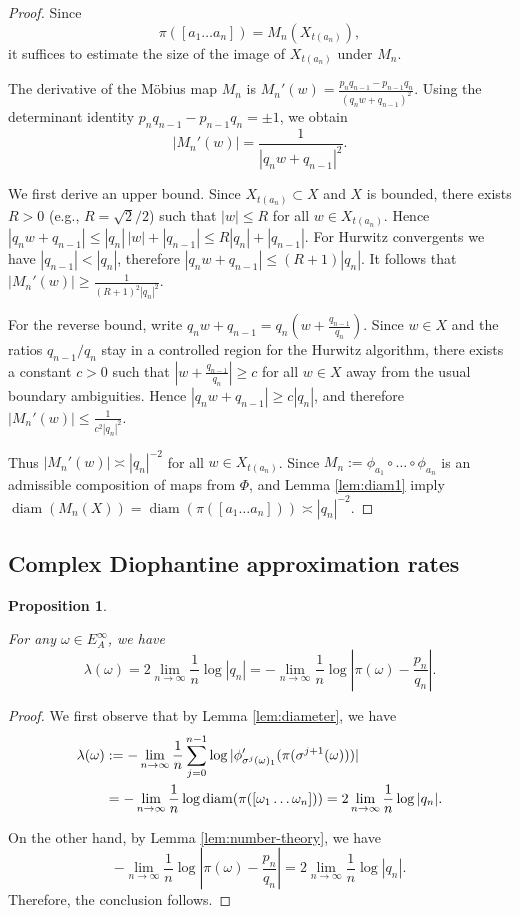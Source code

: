 \documentclass[11pt]{amsart}
\theoremstyle{plain}
\newtheorem{proposition}[theorem]{Proposition}
\theoremstyle{definition}
\renewcommand\~{\tilde}%
\newcommand{\om}{\ensuremath{\omega}}
\numberwithin{equation}{section}
\begin{document}
\begin{proof}
Since
$$
\pi([a_1\dots a_n])=M_n(X_{t(a_{n})}),
$$
it suffices to estimate the size of the image of $X_{t(a_{n})}$ under $M_n$.

The derivative of the Möbius map $M_n$ is
$
M_n'(w)
=
\frac{p_nq_{n-1}-p_{n-1}q_n}{(q_n w+q_{n-1})^2}.
$
Using the determinant identity $p_nq_{n-1}-p_{n-1}q_n=\pm 1$,
we obtain
$$
|M_n'(w)|=\frac{1}{|q_n w+q_{n-1}|^2}.
$$

We first derive an upper bound. Since $X_{t(a_{n})}\subset X$ and $X$ is bounded, there exists $R>0$ (e.g., $R=\sqrt{2}/2$) such that
$|w|\le R$ for all $w\in X_{t(a_{n})}$.
Hence
$
|q_n w+q_{n-1}|
\le |q_n|\,|w|+|q_{n-1}|
\le R|q_n|+|q_{n-1}|.
$
For Hurwitz convergents we have $|q_{n-1}|<|q_n|$, therefore $|q_n w+q_{n-1}|\le (R+1)|q_n|$.
It follows that
$
|M_n'(w)|\ge \frac{1}{(R+1)^2|q_n|^2}.
$

For the reverse bound, write
$
q_n w+q_{n-1}=q_n\left(w+\frac{q_{n-1}}{q_n}\right).
$
Since $w\in X$ and the ratios $q_{n-1}/q_n$ stay in a controlled region for the Hurwitz algorithm, there exists a constant $c>0$ such that $
\left|w+\frac{q_{n-1}}{q_n}\right|\ge c$ for all $w \in X$ away from the usual boundary ambiguities. Hence $|q_n w+q_{n-1}|\ge c|q_n|$, and therefore
$
|M_n'(w)|\le \frac{1}{c^2|q_n|^2}.
$

Thus $|M_n'(w)|\asymp |q_n|^{-2}$ for all $w\in X_{t(a_{n})}$.
Since $M_n:= \phi_{a_1}\circ\dots \circ\phi_{a_n}$ is an admissible composition of maps from $\Phi$, \cite[Lemmas 19.3.5]{Urbanski22} and Lemma \ref{lem:diam1}  imply
$
\operatorname{diam}(M_n(X))=\operatorname{diam}(\pi([a_1\dots a_n]))\asymp |q_n|^{-2}.
$
\end{proof}


\subsection{Complex Diophantine approximation rates}
\begin{proposition}\label{prop:connection}

For any $\om \in E_A^{\infty}$, we have 
$$
    \lambda(\om) = 2\lim_{n\to\infty} \frac{1}{n}\log|q_n| = -\lim_{n \to \infty} \frac{1}{n}\log \left|\pi(\om) - \frac{p_n}{q_n}\right|.
$$


\end{proposition}

\begin{proof}
We first observe that by Lemma \ref{lem:diameter}, we have
\begin{align*}
\lambda(\om)&:=-\lim_{n\to\infty}\frac{1}{n}\sum_{j=0}^{n-1}\log|\phi'_{\sigma^j(\om)_1}(\pi(\sigma^{j+1}(\om)))| \\
&= -\lim_{n \to \infty}\frac{1}{n}\log {\rm diam}(\pi([\om_1\dots \om_n]))= 2\lim_{n \to \infty} \frac{1}{n} \log |q_n|.  
\end{align*}

On the other hand, by Lemma \ref{lem:number-theory}, we have 
$$-\lim_{n \to \infty}\frac{1}{n}\log \left|\pi(\om) - \frac{p_n}{q_n}\right| = 2\lim_{n\to\infty}\frac{1}{n}\log |q_n|.$$
Therefore, the conclusion follows.
\end{proof}
\end{document}
